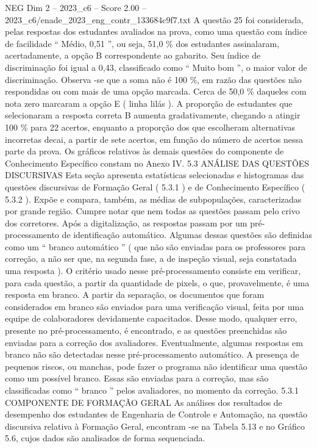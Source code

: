 \begin{textsample}{NEG Dim 2 – 2023\_c6 – Score 2.00 – 2023\_c6/enade\_2023\_eng\_contr\_133684c9f7.txt}
A questão 25 foi considerada, pelas respostas dos estudantes avaliados na prova, como uma questão com índice de facilidade “ Médio, 0,51 ”, ou seja, 51,0 \% dos estudantes assinalaram, acertadamente, a opção B correspondente ao gabarito.
Seu índice de discriminação foi igual a 0,43, classificado como “ Muito bom ”, o maior valor de discriminação.
Observa -se que a soma não é 100 \%, em razão das questões não respondidas ou com mais de uma opção marcada.
Cerca de 50,0 \% daqueles com nota zero marcaram a opção E ( linha lilás ).
A proporção de estudantes que selecionaram a resposta correta B aumenta gradativamente, chegando a atingir 100 \% para 22 acertos, enquanto a proporção dos que escolheram alternativas incorretas decai, a partir de sete acertos, em função do número de acertos nessa parte da prova.
Os gráficos relativos às demais questões do componente de Conhecimento Específico constam no Anexo IV. 5.3 ANÁLISE DAS QUESTÕES DISCURSIVAS Esta seção apresenta estatísticas selecionadas e histogramas das questões discursivas de Formação Geral ( 5.3.1 ) e de Conhecimento Específico ( 5.3.2 ).
Expõe e compara, também, as médias de subpopulações, caracterizadas por grande região.
Cumpre notar que nem todas as questões passam pelo crivo dos corretores.
Após a digitalização, as respostas passam por um pré-processamento de identificação automático.
Algumas dessas questões são definidas como um “ branco automático ” ( que não são enviadas para os professores para correção, a não ser que, na segunda fase, a de inspeção visual, seja constatada uma resposta ).
O critério usado nesse pré-processamento consiste em verificar, para cada questão, a partir da quantidade de pixels, o que, provavelmente, é uma resposta em branco.
A partir da separação, os documentos que foram considerados em branco são enviados para uma verificação visual, feita por uma equipe de colaboradores devidamente capacitados.
Desse modo, qualquer erro, presente no pré-processamento, é encontrado, e as questões preenchidas são enviadas para a correção dos avaliadores.
Eventualmente, algumas respostas em branco não são detectadas nesse pré-processamento automático.
A presença de pequenos riscos, ou manchas, pode fazer o programa não identificar uma questão como um possível branco.
Essas são enviadas para a correção, mas são classificadas como “ branco ” pelos avaliadores, no momento da correção. 5.3.1 COMPONENTE DE FORMAÇÃO GERAL As análises dos resultados de desempenho dos estudantes de Engenharia de Controle e Automação, na questão discursiva relativa à Formação Geral, encontram -se na Tabela 5.13 e no Gráfico 5.6, cujos dados são analisados de forma sequenciada.

\end{textsample}
